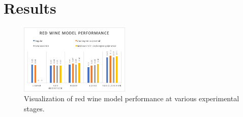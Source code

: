 
\section{Results}
\label{sec:results}

\begin{figure}[htb]

  \centering  %

  \includegraphics[width=0.47\textwidth]{redwine_score.png}

  \caption{Visualization of red wine model performance at various experimental stages.}

  \label{fig:tex}

  \end{figure}


